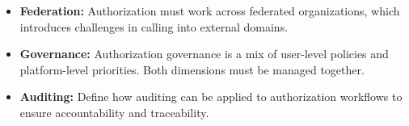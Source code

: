 \begin{itemize}
    \item \textbf{Federation:}  
    Authorization must work across federated organizations, which introduces challenges in calling into external domains.  

    \item \textbf{Governance:}  
    Authorization governance is a mix of user-level policies and platform-level priorities.  
    Both dimensions must be managed together.  

    \item \textbf{Auditing:}  
    Define how auditing can be applied to authorization workflows to ensure accountability and traceability.  
\end{itemize}
